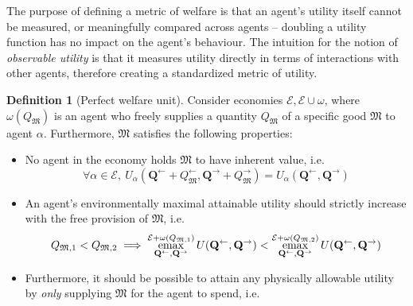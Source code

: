 \documentclass{journal}
\theoremstyle{plain}
\theoremstyle{definition}
\newtheorem{dfn}{Definition}
\theoremstyle{remark}
\newcommand{\economy}{\ensuremath{\mathcal{E}}}
\newcommand{\emax}{\ensuremath{\operatornamewithlimits{emax}}}
\newcommand{\quants}{\ensuremath{Q}} %
\newcommand{\quantl}{\ensuremath{\mathbf{Q}}} %
\newcommand{\agenta}{\ensuremath{\alpha}}
\newcommand{\agentz}{\ensuremath{\omega}}
\newcommand{\money}{\ensuremath{\mathfrak{M}}}
\newcommand{\utility}{\ensuremath{U}}
\begin{document}
The purpose of defining a metric of welfare is that an agent's utility itself cannot be measured, or meaningfully compared across agents -- doubling a utility function has no impact on the agent's behaviour. The intuition for the notion of \emph{observable utility} is that it measures utility directly in terms of interactions with other agents, therefore creating a standardized metric of utility.

\begin{dfn}[Perfect welfare unit]
    \label{dfn:pfu}
    Consider economies $\economy, \economy\cup\agentz$, where $\agentz(\quants_\money)$ is an agent who freely supplies a quantity $\quants_\money$ of a specific good $\money$ to agent $\agenta$. Furthermore, $\money$ satisfies the following properties:
    \begin{itemize}
        \item No agent in the economy holds $\money$ to have inherent value, i.e. 
        \begin{equation}
            \label{eq:pwu1}
            \forall \agenta\in\economy,\  \utility_\agenta(\quantl^\leftarrow + \quants_\money^\leftarrow,\quantl^\rightarrow + \quants_\money^\rightarrow)=\utility_\agenta(\quantl^\leftarrow,\quantl^\rightarrow)
        \end{equation}
        \item An agent's environmentally maximal attainable utility should strictly increase with the free provision of $\money$, i.e. 
        \begin{equation}
            \label{eq:pwu2}
            \quants_{\money, 1} < \quants_{\money, 2} \implies \emax\limits_{\quantl^\leftarrow, \quantl^\rightarrow}^{\economy + \agentz(\quants_{\money, 1})} \utility(\quantl^\leftarrow, \quantl^\rightarrow) < \emax\limits_{\quantl^\leftarrow, \quantl^\rightarrow}^{\economy+\agentz(\quants_{\money, 2})} \utility(\quantl^\leftarrow, \quantl^\rightarrow)
        \end{equation}
        \item Furthermore, it should be possible to attain any physically allowable utility by \emph{only} supplying $\money$ for the agent to spend, i.e.

\end{itemize}
\end{dfn}
\end{document}
